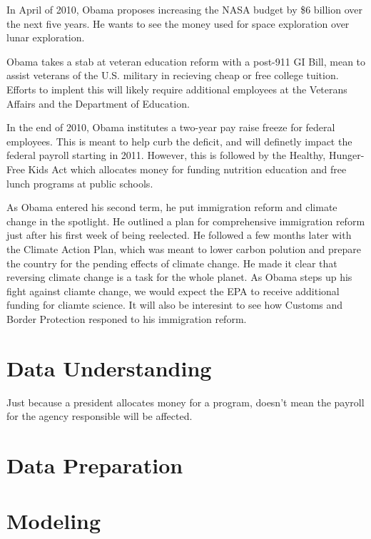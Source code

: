 \documentclass{article}
\begin{document}
        \par
        In April of 2010, Obama proposes increasing the NASA budget by \$6 billion over the next five years. He wants to see the money used for space exploration over lunar exploration.\cite{obamaevents}
        \par
        Obama takes a stab at veteran education reform with a post-911 GI Bill, mean to assist veterans of the U.S. military in recieving cheap or free college tuition.\cite{obamaevents} Efforts to implent this will likely require additional employees at the Veterans Affairs and the Department of Education.
        \par
        In the end of 2010, Obama institutes a two-year pay raise freeze for federal employees. This is meant to help curb the deficit, and will definetly impact the federal payroll starting in 2011. However, this is followed by the Healthy, Hunger-Free Kids Act which allocates money for funding nutrition education and free lunch programs at public schools.
        \par
        As Obama entered his second term, he put immigration reform and climate change in the spotlight. He outlined a plan for comprehensive immigration reform just after his first week of being reelected. He followed a few months later with the Climate Action Plan, which was meant to lower carbon polution and prepare the country for the pending effects of climate change. He made it clear that reversing climate change is a task for the whole planet.\cite{obamaevents} As Obama steps up his fight against cliamte change, we would expect the EPA to receive additional funding for cliamte science. It will also be interesint to see how Customs and Border Protection responed to his immigration reform.

\section{Data Understanding}
Just because a president allocates money for a program, doesn't mean the payroll for the agency responsible will be affected.

\section{Data Preparation}

\section{Modeling}
\end{document}
